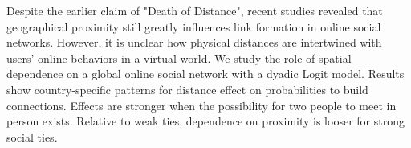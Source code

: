 Despite the earlier claim of "Death of Distance", recent studies revealed that geographical proximity still greatly influences link formation in online social networks. However, it is unclear how physical distances are intertwined with users' online behaviors in a virtual world. We study the role of spatial dependence on a global online social network with a dyadic Logit model. Results show country-specific patterns for distance effect on probabilities to build connections. Effects are stronger when the possibility for two people to meet in person exists. Relative to weak ties, dependence on proximity is looser for strong social ties.